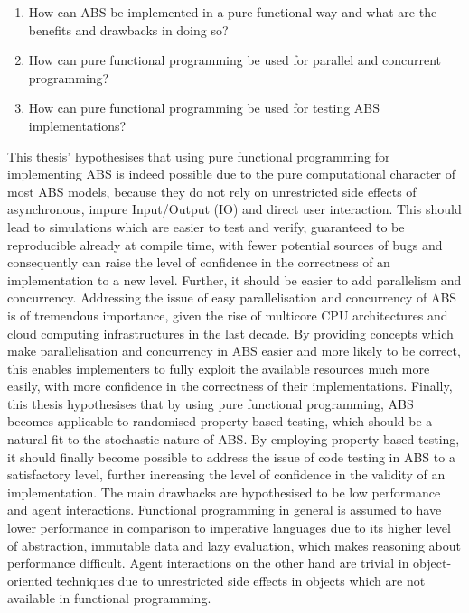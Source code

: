 \begin{enumerate}
	\item How can ABS be implemented in a pure functional way and what are the benefits and drawbacks in doing so?
	\item How can pure functional programming be used for parallel and concurrent programming? 
	\item How can pure functional programming be used for testing ABS implementations?
\end{enumerate}

\medskip

This thesis' hypothesises that using pure functional programming for implementing ABS is indeed possible due to the pure computational character of most ABS models, because they do not rely on unrestricted side effects of asynchronous, impure Input/Output (IO) and direct user interaction. This should lead to simulations which are easier to test and verify, guaranteed to be reproducible already at compile time, with fewer potential sources of bugs and consequently can raise the level of confidence in the correctness of an implementation to a new level. Further, it should be easier to add parallelism and concurrency. Addressing the issue of easy parallelisation and concurrency of ABS is of tremendous importance, given the rise of multicore CPU architectures and cloud computing infrastructures in the last decade. By providing concepts which make parallelisation and concurrency in ABS easier and more likely to be correct, this enables implementers to fully exploit the available resources much more easily, with more confidence in the correctness of their implementations. Finally, this thesis hypothesises that by using pure functional programming, ABS becomes applicable to randomised property-based testing, which should be a natural fit to the stochastic nature of ABS. By employing property-based testing, it should finally become possible to address the issue of code testing in ABS to a satisfactory level, further increasing the level of confidence in the validity of an implementation. The main drawbacks are hypothesised to be low performance and agent interactions. Functional programming in general is assumed to have lower performance in comparison to imperative languages due to its higher level of abstraction, immutable data and lazy evaluation, which makes reasoning about performance difficult. Agent interactions on the other hand are trivial in object-oriented techniques due to unrestricted side effects in objects which are not available in functional programming.

